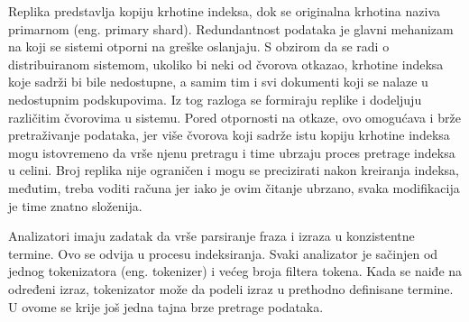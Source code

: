 \par
Replika predstavlja kopiju krhotine indeksa, dok se originalna krhotina naziva primarnom (eng. primary shard). Redundantnost podataka je glavni mehanizam na koji se sistemi otporni na greške oslanjaju. S obzirom da se radi o distribuiranom sistemom, ukoliko bi neki od čvorova otkazao, krhotine indeksa koje sadrži bi bile nedostupne, a samim tim i svi dokumenti koji se nalaze u nedostupnim podskupovima. Iz tog razloga se formiraju replike i dodeljuju različitim čvorovima u sistemu. Pored otpornosti na otkaze, ovo omogućava i brže pretraživanje podataka, jer više čvorova koji sadrže istu kopiju krhotine indeksa mogu istovremeno da vrše njenu pretragu i time ubrzaju proces pretrage indeksa u celini. Broj replika nije ograničen i mogu se precizirati nakon kreiranja indeksa, međutim, treba voditi računa jer iako je ovim čitanje ubrzano, svaka modifikacija je time znatno složenija.

\par
Analizatori imaju zadatak da vrše parsiranje fraza i izraza u konzistentne termine. Ovo se odvija u procesu indeksiranja. Svaki analizator je sačinjen od jednog tokenizatora (eng. tokenizer) i većeg broja filtera tokena. Kada se naiđe na određeni izraz, tokenizator može da podeli izraz u prethodno definisane termine. U ovome se krije još jedna tajna brze pretrage podataka.
